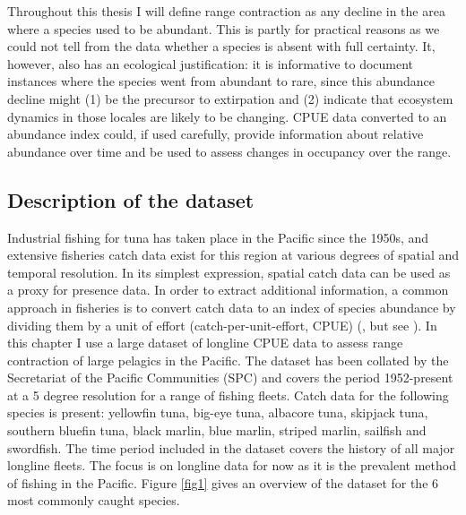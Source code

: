 \documentclass{article}
\begin{document}

Throughout this thesis I will define range contraction as any decline
in the area where a species used to be abundant. This is partly for
practical reasons as we could not tell from the data whether a species
is absent with full certainty. It, however, also has an ecological
justification: it is informative to document instances where the
species went from abundant to rare, since this abundance decline might
(1) be the precursor to extirpation and (2) indicate that ecosystem
dynamics in those locales are likely to be changing. CPUE data
converted to an abundance index could, if used carefully, provide
information about relative abundance over time and be used to assess
changes in occupancy over the range.


\subsection{Description of the dataset}

Industrial fishing for tuna has taken place in the Pacific since the
1950s, and extensive fisheries catch data exist for this region at
various degrees of spatial and temporal resolution. In its simplest
expression, spatial catch data can be used as a proxy for presence
data. In order to extract additional information, a common approach in
fisheries is to convert catch data to an index of species abundance by dividing
them by a unit of effort (catch-per-unit-effort, CPUE)
(\citealt{Maunder2004_a}, but see \citealt{Harley2001_a}). In this
chapter I use a large dataset of longline CPUE data
to assess range contraction of large pelagics in the
Pacific. The dataset has
been collated by the Secretariat of the Pacific Communities (SPC) and
covers the period 1952-present at a 5 degree
resolution for a range of fishing fleets. Catch data for the following species is
present: yellowfin tuna, big-eye tuna, albacore tuna, skipjack
tuna, southern bluefin tuna, black marlin, blue marlin, striped
marlin, sailfish and swordfish. The time period included in the dataset
covers the history of all major longline fleets. The focus is on
longline data for now as it is the prevalent method of fishing in the
Pacific. Figure \ref{fig1} gives an overview of the dataset for the 6 most
commonly caught species.
\end{document}
